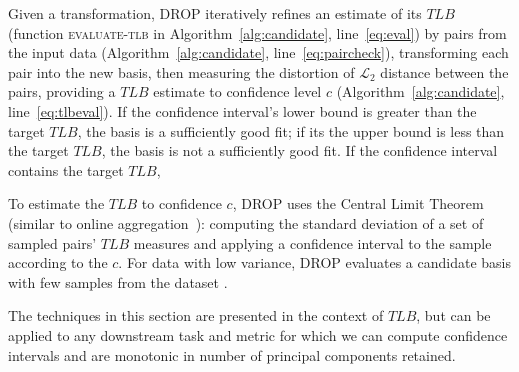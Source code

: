 Given a transformation, DROP iteratively refines an estimate of its $TLB$ (function \textsc{evaluate-tlb} in Algorithm~\ref{alg:candidate}, line~\ref{eq:eval}) by  pairs from the input data (Algorithm~\ref{alg:candidate}, line~\ref{eq:paircheck}), transforming each pair into the new basis, then measuring the distortion of $\mathcal{L}_2$ distance between the pairs, providing a $TLB$ estimate to confidence level $c$ (Algorithm~\ref{alg:candidate}, line~\ref{eq:tlbeval}). 
If the confidence interval's lower bound is greater than the target $TLB$, the basis is a sufficiently good fit; if its the upper bound is less than the target $TLB$, the basis is not a sufficiently good fit. 
If the confidence interval contains the target $TLB$,  

To estimate the $TLB$ to confidence $c$, DROP uses the Central Limit Theorem (similar to online aggregation~\cite{onlineagg}): computing the standard deviation of a set of sampled pairs' $TLB$ measures and applying a confidence interval to the sample according to the $c$.
For data with low variance, DROP evaluates a candidate basis with few samples from the dataset . 

The techniques in this section are presented in the context of $TLB$, but can be applied to any downstream task and metric for which we can compute confidence intervals and are monotonic in number of principal components retained.

